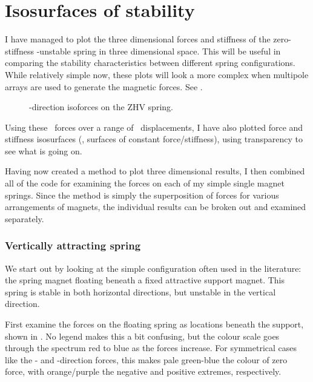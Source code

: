 \section{Isosurfaces of stability}

I have managed to plot the three dimensional forces and stiffness of
the zero-stiffness \x-unstable spring in three dimensional space. This
will be useful in comparing the stability characteristics between
different spring configurations. While relatively simple now, these
plots will look a more complex when multipole arrays are used to
generate the magnetic forces. See .

\begin{figure}
   \centering
   \caption{\x-direction isoforces on the ZHV spring.}
\end{figure}

Using these \threeD\ forces over a range of \threeD\ displacements, I have
also plotted force and stiffness isosurfaces (\ie, surfaces of constant
force/stiffness), using transparency to see what is going on.

Having now created a method to plot three dimensional results, I then combined
all of the code for examining the forces on each of my simple single magnet
springs. Since the method is simply the superposition of forces for various
arrangements of magnets, the individual results can be broken out and examined
separately.

\subsubsection{Vertically attracting spring}

We start out by looking at the simple configuration often used in the
literature: the spring magnet floating beneath a fixed attractive support
magnet. This spring is stable in both horizontal directions, but unstable in
the vertical direction.

First examine the forces on the floating spring as locations beneath the
support, shown in . No legend makes this a bit confusing,
but the colour scale goes through the spectrum red to blue as the forces
increase. For symmetrical cases like the \x- and \y-direction forces, this
makes pale green-blue the colour of zero force, with orange/purple the
negative and positive extremes, respectively.


